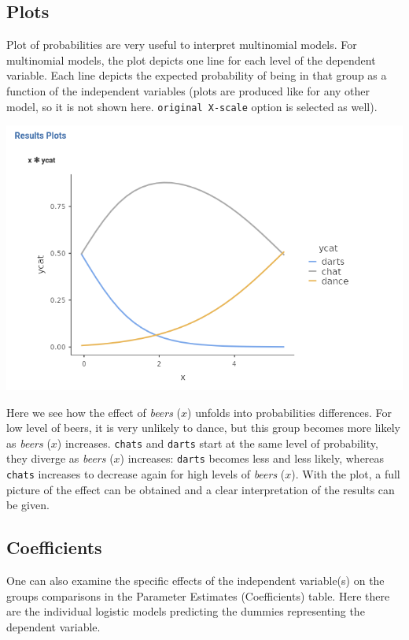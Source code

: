 \documentclass[
]{book}
\begin{document}
\hypertarget{plots-2}{%
\subsection{Plots}\label{plots-2}}

Plot of probabilities are very useful to interpret multinomial models. For multinomial models, the plot depicts one line for each level of the dependent variable. Each line depicts the expected probability of being in that group as a function of the independent variables (plots are produced like for any other model, so it is not shown here. \texttt{original\ X-scale} option is selected as well).

\includegraphics{bookletpics/3_multi_plot1.png}

Here we see how the effect of \emph{beers} (\(x\)) unfolds into probabilities differences. For low level of beers, it is very unlikely to dance, but this group becomes more likely as \emph{beers} (\(x\)) increases. \texttt{chats} and \texttt{darts} start at the same level of probability, they diverge as \emph{beers} (\(x\)) increases: \texttt{darts} becomes less and less likely, whereas \texttt{chats} increases to decrease again for high levels of \emph{beers} (\(x\)). With the plot, a full picture of the effect can be obtained and a clear interpretation of the results can be given.

\hypertarget{coefficients-2}{%
\subsection{Coefficients}\label{coefficients-2}}

One can also examine the specific effects of the independent variable(s) on the groups comparisons in the {Parameter Estimates (Coefficients)} table. Here there are the individual logistic models predicting the dummies representing the dependent variable.
\end{document}
